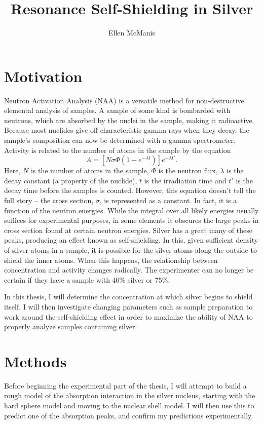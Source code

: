 \documentclass{article}
\title{Resonance Self-Shielding in Silver}
\author{Ellen McManis}
\begin{document}
\maketitle

\section{Motivation}
Neutron Activation Analysis (NAA) is a versatile method for non-destructive elemental analysis of samples\cite{naa}. A sample of some kind is bombarded with neutrons, which are absorbed by the nuclei in the sample, making it radioactive. Because most %
nuclides give off characteristic gamma rays when they decay, the sample's composition can now be determined with a gamma spectrometer. Activity is related to the number of atoms in the sample by the equation
\begin{equation}
A = [N\sigma \Phi(1-e^{-\lambda t})]e^{-\lambda t'}\mbox{.}
\end{equation}
Here, $N$ is the number of atoms in the sample, $\Phi$ is the neutron flux, $\lambda$ is the decay constant (a property of the nuclide), $t$ is the irradiation time and $t'$ is the decay time before the samples is counted. However, this equation doesn't tell the full story -- the cross section, $\sigma$, is represented as a constant. In fact, it is a function of the neutron energies. While the integral over all likely energies usually suffices for experimental purposes, in some elements it obscures the large peaks in cross section found at certain neutron energies. Silver has a great many of these peaks, producing an effect known as self-shielding. In this, given sufficient density of silver atoms in a sample, it is possible for the silver atoms along the outside to shield the inner atoms. When this happens, the relationship between concentration and activity changes radically. The experimenter can no longer be certain if they have a sample with 40\% silver or 75\%. 

In this thesis, I will determine the concentration at which silver begins to shield itself. I will then investigate changing parameters such as sample preparation to work around the self-shielding effect in order to maximize the ability of NAA to properly analyze samples containing silver.

\section{Methods}
Before beginning the experimental part of the thesis, I will attempt to build a rough model of the absorption interaction in the silver nucleus, starting with the hard sphere model and moving to the nuclear shell model\cite{nucphys}. I will then use this to predict one of the absorption peaks, and confirm my predictions experimentally. 
\end{document}
